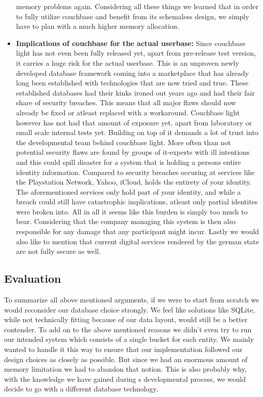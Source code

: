 \begin{itemize}
memory problems again.
Considering all these things we learned that in order to fully utilize couchbase and benefit from its schemaless design, we simply have to plan with a much higher memory allocation.
\item \label{db_crit_three} \textbf{Implications of couchbase for the actual userbase:}
Since couchbase light has not even been fully released yet, apart from pre-release test version, it carries a huge risk for the actual userbase. This is an unproven newly developed database framework coming into a marketplace that has already long been established with technologies that are now tried and true.
These established databases had their kinks ironed out years ago and had their fair share of security breaches. This means that all major flaws should now already be fixed or atleast replaced with a workaround. Couchbase light however has not had that amount of exposure yet, apart from laboratory or small scale internal tests yet.
Building on top of it demands a lot of trust into the developmental team behind couchbase light. More often than not potential security flaws are found by groups of it-experts with ill intentions and this could spill disaster for a system that is holding a persons entire identity information.\cite{biggestCyberSecurityDisasters2017}
Compared to security breaches occuring at services like the Playstation Network, Yahoo, iCloud, \projectName{} holds the entirety of your identity. The aforementioned services only hold part of your identity, and while a breach could still have catastrophic implications, atleast only partial identites were broken into.
All in all it seems like this burden is simply too much to bear. Considering that the company managing this system is then also responsible for any damage that any participant might incur. Lastly we would also like to mention that current digital services rendered by the german state are not fully secure as well.\cite{cccNewIdBroken,cccNewIdProblems}
\end{itemize}

\subsection{Evaluation}
\label{ssec:databaseEvalEval}
To summarize all above mentioned arguments, if we were to start from scratch we would reconsider our database choice strongly. We feel like solutions like SQLite, while not technically fitting because of our data layout, would still be a better contender.
To add on to the above mentioned reasons we didn't even try to run our intended system which consists of a single bucket for each entity. We mainly wanted to handle it this way to ensure that our implementation followed our design choices as closely as possible.
But since we had an enormous amount of memory limitation we had to abandon that notion. This is also probably why, with the knowledge we have gained during \projectName{}s developmental process, we would decide to go with a different database technology.